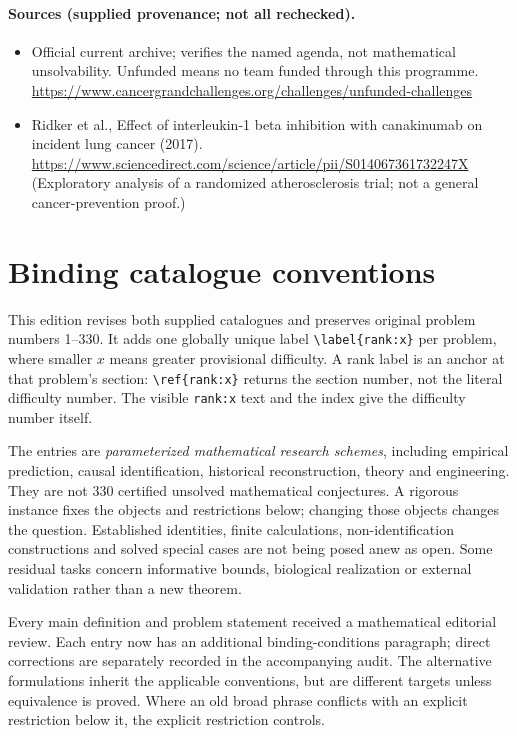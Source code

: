 \documentclass[11pt]{article}
\begin{document}
\paragraph{Sources (supplied provenance; not all rechecked).} \begin{itemize}
\item Official current archive; verifies the named agenda, not mathematical unsolvability. Unfunded means no team funded through this programme. \url{https://www.cancergrandchallenges.org/challenges/unfunded-challenges}
\item Ridker et al., Effect of interleukin-1 beta inhibition with canakinumab on incident lung cancer (2017). \url{https://www.sciencedirect.com/science/article/pii/S014067361732247X} (Exploratory analysis of a randomized atherosclerosis trial; not a general cancer-prevention proof.)
\end{itemize}


\section*{Binding catalogue conventions}
This edition revises both supplied catalogues and preserves original problem numbers 1--330. It adds one globally unique label \verb|\label{rank:x}| per problem, where smaller $x$ means greater provisional difficulty. A rank label is an anchor at that problem's section: \verb|\ref{rank:x}| returns the section number, not the literal difficulty number. The visible \texttt{rank:x} text and the index give the difficulty number itself.

The entries are \emph{parameterized mathematical research schemes}, including empirical prediction, causal identification, historical reconstruction, theory and engineering. They are not 330 certified unsolved mathematical conjectures. A rigorous instance fixes the objects and restrictions below; changing those objects changes the question. Established identities, finite calculations, non-identification constructions and solved special cases are not being posed anew as open. Some residual tasks concern informative bounds, biological realization or external validation rather than a new theorem.

Every main definition and problem statement received a mathematical editorial review. Each entry now has an additional binding-conditions paragraph; direct corrections are separately recorded in the accompanying audit. The alternative formulations inherit the applicable conventions, but are different targets unless equivalence is proved. Where an old broad phrase conflicts with an explicit restriction below it, the explicit restriction controls.
\end{document}
